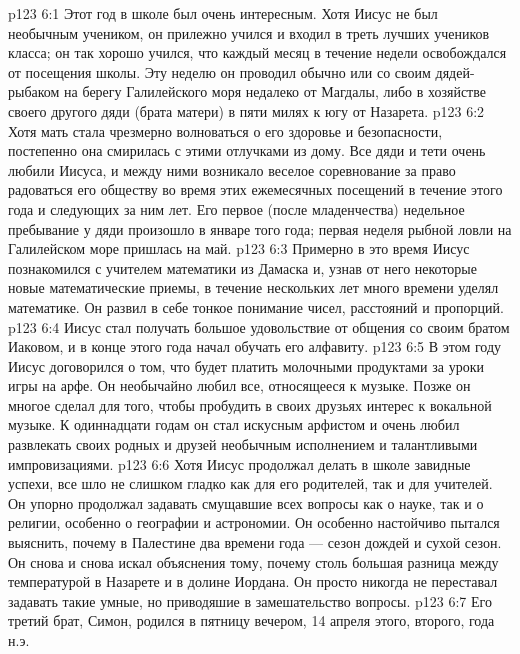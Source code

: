 \vs p123 6:1 Этот год в школе был очень интересным. Хотя Иисус не был необычным учеником, он прилежно учился и входил в треть лучших учеников класса; он так хорошо учился, что каждый месяц в течение недели освобождался от посещения школы. Эту неделю он проводил обычно или со своим дядей\hyp{}рыбаком на берегу Галилейского моря недалеко от Магдалы, либо в хозяйстве своего другого дяди (брата матери) в пяти милях к югу от Назарета.
\vs p123 6:2 Хотя мать стала чрезмерно волноваться о его здоровье и безопасности, постепенно она смирилась с этими отлучками из дому. Все дяди и тети очень любили Иисуса, и между ними возникало веселое соревнование за право радоваться его обществу во время этих ежемесячных посещений в течение этого года и следующих за ним лет. Его первое (после младенчества) недельное пребывание у дяди произошло в январе того года; первая неделя рыбной ловли на Галилейском море пришлась на май.
\vs p123 6:3 Примерно в это время Иисус познакомился с учителем математики из Дамаска и, узнав от него некоторые новые математические приемы, в течение нескольких лет много времени уделял математике. Он развил в себе тонкое понимание чисел, расстояний и пропорций.
\vs p123 6:4 Иисус стал получать большое удовольствие от общения со своим братом Иаковом, и в конце этого года начал обучать его алфавиту.
\vs p123 6:5 В этом году Иисус договорился о том, что будет платить молочными продуктами за уроки игры на арфе. Он необычайно любил все, относящееся к музыке. Позже он многое сделал для того, чтобы пробудить в своих друзьях интерес к вокальной музыке. К одиннадцати годам он стал искусным арфистом и очень любил развлекать своих родных и друзей необычным исполнением и талантливыми импровизациями.
\vs p123 6:6 Хотя Иисус продолжал делать в школе завидные успехи, все шло не слишком гладко как для его родителей, так и для учителей. Он упорно продолжал задавать смущавшие всех вопросы как о науке, так и о религии, особенно о географии и астрономии. Он особенно настойчиво пытался выяснить, почему в Палестине два времени года --- сезон дождей и сухой сезон. Он снова и снова искал объяснения тому, почему столь большая разница между температурой в Назарете и в долине Иордана. Он просто никогда не переставал задавать такие умные, но приводяшие в замешательство вопросы.
\vs p123 6:7 \pc Его третий брат, Симон, родился в пятницу вечером, 14 апреля этого, второго, года н.э.
